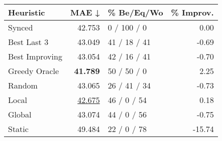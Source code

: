 \begin{tabular}{lrlr}
\toprule
\textbf{Heuristic} & \textbf{MAE ↓} & \textbf{\% Be/Eq/Wo} & \textbf{\% Improv.} \\
\midrule
            Synced &         42.753 &          0 / 100 / 0 &                0.00 \\
\midrule
       Best Last 3 &         43.049 &         41 / 18 / 41 &               -0.69 \\
    Best Improving &         43.054 &         42 / 16 / 41 &               -0.70 \\
\addlinespace
     Greedy Oracle &         \textbf{41.789} &          50 / 50 / 0 &                2.25 \\
            Random &         43.065 &         26 / 41 / 34 &               -0.73 \\
\midrule
             Local &         \underline{42.675} &          46 / 0 / 54 &                0.18 \\
            Global &         43.074 &          44 / 0 / 56 &               -0.75 \\
\midrule
            Static &         49.484 &          22 / 0 / 78 &              -15.74 \\
\bottomrule
\end{tabular}

\label{tab:iid_lr05_le2_bs2_Summary}
